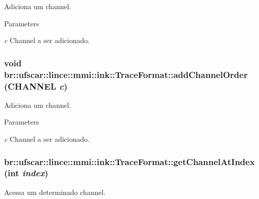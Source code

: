 Adiciona um channel. 


\begin{DoxyParams}{Parameters}
\item[{\em c}]Channel a ser adicionado. \end{DoxyParams}
\hypertarget{classbr_1_1ufscar_1_1lince_1_1mmi_1_1ink_1_1TraceFormat_a4f21a24e009159e4062f2a2a47cc68fc}{
\subsubsection[{addChannelOrder}]{\setlength{\rightskip}{0pt plus 5cm}void br::ufscar::lince::mmi::ink::TraceFormat::addChannelOrder ({\bf CHANNEL} {\em c})}}
\label{classbr_1_1ufscar_1_1lince_1_1mmi_1_1ink_1_1TraceFormat_a4f21a24e009159e4062f2a2a47cc68fc}


Adiciona um channel. 


\begin{DoxyParams}{Parameters}
\item[{\em c}]Channel a ser adicionado. \end{DoxyParams}
\hypertarget{classbr_1_1ufscar_1_1lince_1_1mmi_1_1ink_1_1TraceFormat_af6c038f7182928e11aedafe61a7f1af0}{
\subsubsection[{getChannelAtIndex}]{ br::ufscar::lince::mmi::ink::TraceFormat::getChannelAtIndex (int {\em index})}}
\label{classbr_1_1ufscar_1_1lince_1_1mmi_1_1ink_1_1TraceFormat_af6c038f7182928e11aedafe61a7f1af0}


Acessa um determinado channel. 


